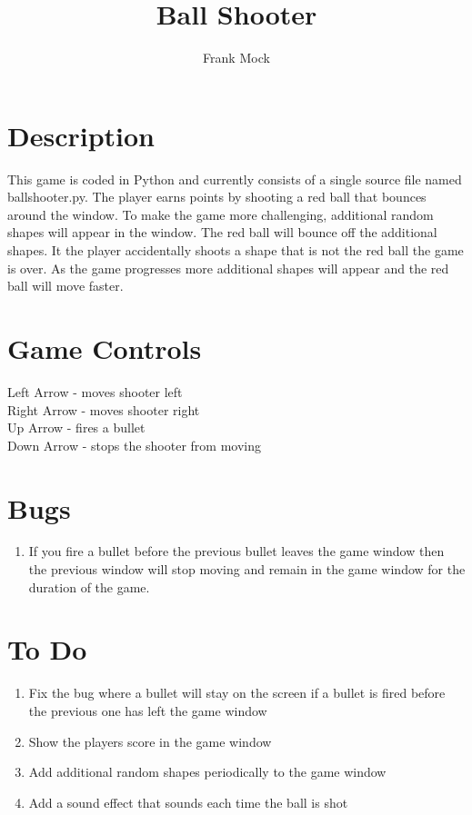 \documentclass[12pt,letterpaper]{article}
\title{Ball Shooter}
\author{Frank Mock}
\begin{document}
\maketitle
\section*{Description}
This game is coded in Python and currently consists of a single source file named ballshooter.py. The player earns points by shooting a red ball that bounces around the window. To make the game more challenging, additional random shapes will appear in the window. The red ball will bounce off the additional shapes. It the player accidentally shoots a shape that is not the red ball the game is over. As the game progresses more additional shapes will appear and the red ball will move faster.
\section*{Game Controls}
Left Arrow - moves shooter left\\
Right Arrow - moves shooter right\\
Up Arrow - fires a bullet\\
Down Arrow - stops the shooter from moving\\
\section*{Bugs}
\begin{enumerate}
 \item If you fire a bullet before the previous bullet leaves the game window then the previous window will stop moving and remain in the game window for the duration of the game.
\end{enumerate}
\section*{To Do}
\begin{enumerate}
 \item Fix the bug where a bullet will stay on the screen if a bullet is fired before the previous one has left the game window
 \item Show the players score in the game window
 \item Add additional random shapes periodically to the game window
 \item Add a sound effect that sounds each time the ball is shot 
 \end{enumerate} 
\end{document}
